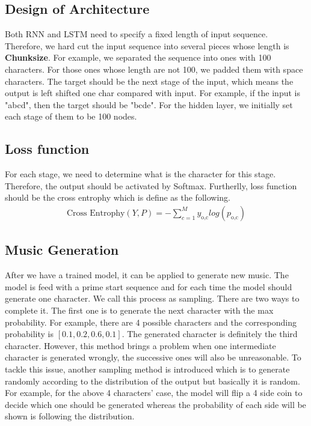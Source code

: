 \documentclass{article}
\begin{document}
\subsection{Design of Architecture}
Both RNN and LSTM need to specify a fixed length of input sequence. Therefore, we hard cut the input sequence into several pieces whose length is \textbf{Chunksize}. For example, we separated the sequence into ones with 100 characters. For those ones whose length are not 100, we padded them with space characters. The target should be the next stage of the input, which means the output is left shifted one char compared with input. For example, if the input is "abcd", then the target should be "bcde". For the hidden layer, we initially set each stage of them to be 100 nodes.
\subsection{Loss function}
For each stage, we need to determine what is the character for this stage. Therefore, the output should be activated by Softmax. Furtherlly, loss function should be the cross entrophy which is define as the following.
\begin{equation}
\begin{split}
    \text{Cross Entrophy}(Y,P) = -\sum_{c=1}^My_{\text{o,c}}log(p_{\text{o,c}})
\end{split}
\label{equation: weight_loss}
\end{equation}
\subsection{Music Generation}
After we have a trained model, it can be applied to generate new music. The model is feed with a prime start sequence and for each time the model should generate one character. We call this process as sampling. There are two ways to complete it. The first one is to generate the next character with the max probability. For example, there are 4 possible characters and the corresponding probability is $[0.1,0.2,0.6,0.1]$. The generated character is definitely the third character. However, this method brings a problem when one intermediate character is generated wrongly, the successive ones will also be unreasonable. To tackle this issue, another sampling method is introduced which is to generate randomly according to the distribution of the output but basically it is random. For example, for the above 4 characters' case, the model will flip a 4 side coin to decide which one should be generated whereas the probability of each side will be shown is following the distribution.
\end{document}
